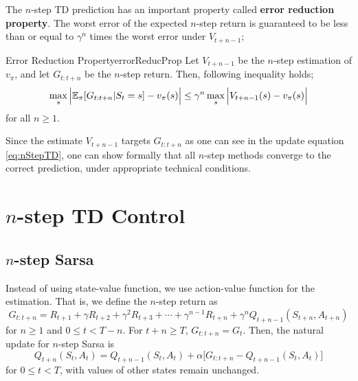 \documentclass[../../main.tex]{subfiles}
\begin{document}
        The $n$-step TD prediction has an important property called \textbf{error reduction property}.
        The worst error of the expected $n$-step return is guaranteed to be less than or equal to $\gamma^n$ times the worst error under $V_{t+n-1}$;
        \begin{defn}{Error Reduction Property}{errorReducProp}
            Let $V_{t+n-1}$ be the $n$-step estimation of $v_\pi$, and let $G_{t:t+n}$ be the $n$-step return.
            Then, following inequality holds;
            \begin{equation}
                \max_s{\Big| \mathbb{E}_\pi[G_{t:t+n}|S_t=s] - v_\pi(s) \Big|} \leq \gamma^n \max_s{\Big| V_{t+n-1}(s) - v_\pi(s) \Big|}
            \end{equation}
            for all $n \geq 1$.
        \end{defn}
        Since the estimate $V_{t+n-1}$ targets $G_{t:t+n}$ as one can see in the update equation \ref{eq:nStepTD}, one can show formally that
        all $n$-step methods converge to the correct prediction, under appropriate technical conditions.

\section{$n$-step TD Control}
    \subsection{$n$-step Sarsa}
        Instead of using state-value function, we use action-value function for the estimation. That is, we define the $n$-step return as
        \begin{equation}
            G_{t:t+n} = R_{t+1} + \gamma R_{t+2} + \gamma^2 R_{t+3} + \cdots + \gamma^{n-1} R_{t+n} + \gamma^n Q_{t+n-1}(S_{t+n},A_{t+n})
        \end{equation}
        for $n \geq 1$ and $0 \leq t < T-n$.
        For $t+n \geq T$, $G_{t:t+n}=G_t$. Then, the natural update for $n$-step Sarsa is
        \begin{equation}
            Q_{t+n}(S_t,A_t) = Q_{t+n-1}(S_t,A_t) + \alpha \Big[ G_{t:t+n} - Q_{t+n-1}(S_t,A_t) \Big]
        \end{equation}
        for $0 \leq t < T$, with values of other states remain unchanged.
\end{document}
